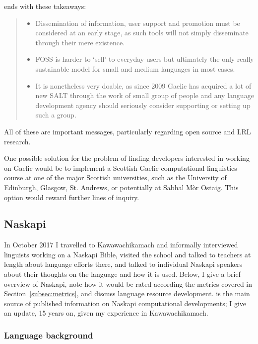 \citet{bauer2014salt} ends with these takeaways:

\begin{quote}
\begin{itemize}
  \item Dissemination of information, user support and promotion must be considered at an early stage, as such tools will not simply disseminate through their mere existence.
  \item FOSS is harder to `sell' to everyday users but ultimately the only really sustainable model for small and medium languages in most cases.
  \item It is nonetheless very doable, as since 2009 Gaelic has acquired a lot of new SALT through the work of small group of people and any language development agency should seriously consider supporting or setting up such a group.
\end{itemize}
\end{quote}

All of these are important messages, particularly regarding open source and LRL research.

One possible solution for the problem of finding developers interested in working on Gaelic would be to implement a Scottish Gaelic computational linguistics course at one of the major Scottish universities, such as the University of Edinburgh, Glasgow, St. Andrews, or potentially at Sabhal M\`or Ostaig. This option would reward further lines of inquiry.

\subsection{Naskapi}
\label{sec:naskapi}

In October 2017 I travelled to Kawawachikamach and informally interviewed linguists working on a Naskapi Bible, visited the school and talked to teachers at length about language efforts there, and talked to individual Naskapi speakers about their thoughts on the language and how it is used. Below, I give a brief overview of Naskapi, note how it would be rated according the metrics covered in Section~\ref{subsec:metrics}, and discuss language resource development. \citet{jancewicz2002applied} is the main source of published information on Naskapi computational developments; I give an update, 15 years on, given my experience in Kawawachikamach. %

\subsubsection{Language background}
\label{sec:naskapi-language-background}

